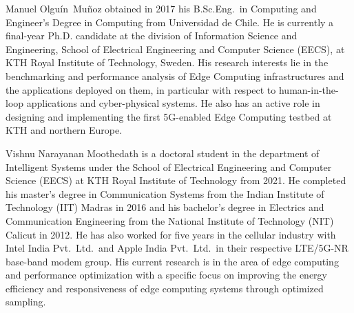 \newpage%
\normalfont%
\begin{IEEEbiography}%
    Manuel Olguín~Muñoz obtained in 2017 his B.Sc.Eng.\ in Computing and Engineer's Degree in Computing from Universidad de Chile.
    He is currently a final-year Ph.D. candidate at the division of Information Science and Engineering, School of Electrical Engineering and Computer Science (EECS), at KTH Royal Institute of Technology, Sweden.
    His research interests lie in the benchmarking and performance analysis of Edge Computing infrastructures and the applications deployed on them, in particular with respect to human-in-the-loop applications and cyber-physical systems.
    He also has an active role in designing and implementing the first 5G-enabled Edge Computing testbed at KTH and northern Europe.
\end{IEEEbiography}
\begin{IEEEbiography}%
    Vishnu Narayanan Moothedath is a doctoral student in the department of Intelligent Systems under the School of Electrical Engineering and Computer Science (EECS) at KTH Royal Institute of Technology from 2021.
    He completed his master's degree in Communication Systems from the Indian Institute of Technology (IIT) Madras in 2016 and his bachelor's degree in Electrics and Communication Engineering from the National Institute of Technology (NIT) Calicut in 2012.
    He has also worked for five years in the cellular industry with Intel India Pvt.\ Ltd.\ and Apple India Pvt.\ Ltd.\ in their respective LTE/5G-NR base-band modem group.
    His current research is in the area of edge computing and performance optimization with a specific focus on improving the energy efficiency and responsiveness of edge computing systems through optimized sampling.
\end{IEEEbiography}
